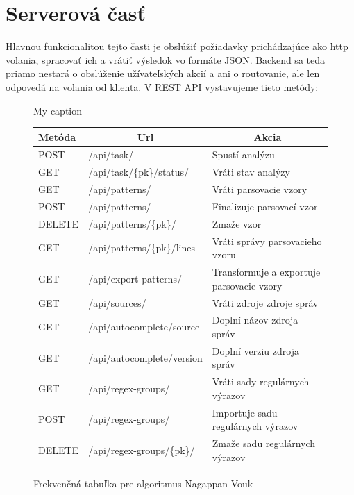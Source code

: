 \chapter{Serverová časť}
Hlavnou funkcionalitou tejto časti je obslúžiť požiadavky prichádzajúce ako http volania, spracovať ich a vrátiť výsledok vo formáte JSON. Backend sa teda priamo nestará o obslúženie užívateľských akcií a ani o routovanie, ale len odpovedá na volania od klienta. V REST API vystavujeme tieto metódy:

\begin{figure}[htbp]
 \begin{minipage}{0.9\linewidth}
 	\centering
\centering
\caption{My caption}
\label{my-label}
\begin{tabular}{|l|l|l|}
\hline
Metóda & \multicolumn{1}{c|}{Url}   & \multicolumn{1}{c|}{Akcia}                \\ \hline
POST   & /api/task/                 & Spustí analýzu                            \\ \hline
GET    & /api/task/\{pk\}/status/   & Vráti stav analýzy                        \\ \hline
GET    & /api/patterns/             & Vráti parsovacie vzory                    \\ \hline
POST   & /api/patterns/             & Finalizuje parsovací vzor                 \\ \hline
DELETE & /api/patterns/\{pk\}/      & Zmaže vzor                                \\ \hline
GET    & /api/patterns/\{pk\}/lines & Vráti správy parsovacieho vzoru           \\ \hline
GET    & /api/export-patterns/      & Transformuje a exportuje parsovacie vzory \\ \hline
GET    & /api/sources/              & Vráti zdroje zdroje správ                 \\ \hline
GET    & /api/autocomplete/source   & Doplní názov zdroja správ                 \\ \hline
GET    & /api/autocomplete/version  & Doplní verziu zdroja správ                \\ \hline
GET    & /api/regex-groups/         & Vráti sady regulárnych výrazov            \\ \hline
POST   & /api/regex-groups/         & Importuje sadu regulárnych výrazov        \\ \hline
DELETE & /api/regex-groups/\{pk\}/  & Zmaže sadu regulárnych výrazov            \\ \hline
\end{tabular}
 \end{minipage}
 \caption{Frekvenčná tabuľka pre algoritmus Nagappan-Vouk}
\label{fig:nagappan}
\end{figure}


